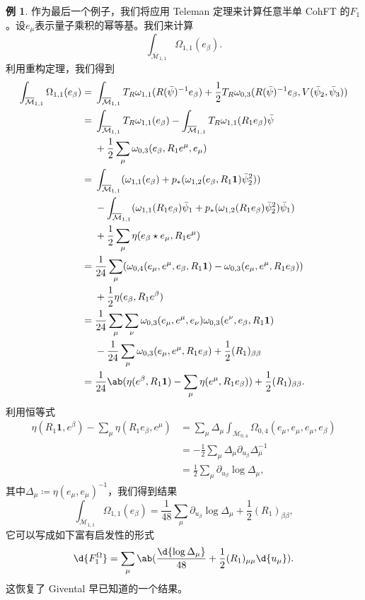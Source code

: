 \documentclass{amsart}
\theoremstyle{definition}
\newtheorem{exm}[thm]{例}
\theoremstyle{remark}
\theoremstyle{plain}
\theoremstyle{definition}
\theoremstyle{remark}
\newcommand{\Mbar}{\overline{\mathcal{M}}}
\newcommand{\1}{\mathbf{1}}
\newcommand{\2}{\mathbf{2}}
\newcommand{\3}{\mathbf{3}}
\begin{document}
\begin{exm}
    作为最后一个例子，我们将应用 Teleman 定理来计算任意半单 CohFT 的$F_1$。设$e_{\mu}$表示量子乘积的幂等基。我们来计算
    \[ \int_{\Mbar_{1,1}} \Omega_{1,1}(e_{\beta}). \]
    利用重构定理，我们得到
    \begin{align*}
        \int_{\Mbar_{1,1}}\Omega_{1,1}(e_{\beta}) ={}& \int_{\Mbar_{1,1}} T_R \omega_{1,1}(R(\bar{\psi})^{-1} e_{\beta}) + \frac{1}{2} T_R \omega_{0,3}(R(\bar{\psi})^{-1} e_{\beta}, V(\bar{\psi}_2, \bar{\psi}_3)) \\
        ={}& \int_{\Mbar_{1,1}}T_R\omega_{1,1}(e_{\beta}) - \int_{\Mbar_{1,1}} T_R \omega_{1,1}(R_1 e_{\beta})\bar{\psi} \\
        &+ \frac{1}{2}\sum_{\mu}  \omega_{0,3}(e_{\beta}, R_1 e^{\mu}, e_{\mu}) \\
        ={}& \int_{\Mbar_{1,1}} ( \omega_{1,1}(e_{\beta}) + p_* ( \omega_{1,2}(e_{\beta}, R_1 \1) \bar{\psi}_2^2 )) \\
        &- \int_{\Mbar_{1,1}} (\omega_{1,1}(R_1 e_{\beta})\bar{\psi}_1 + p_* ( \omega_{1,2}(R_1 e_{\beta}) \bar{\psi}_2^2 ) \bar{\psi}_1) \\
        &+ \frac{1}{2} \sum_{\mu} \eta(e_{\beta} \star e_{\mu}, R_1 e^{\mu}) \\
        ={}& \frac{1}{24} \sum_{\mu} ( \omega_{0,4}(e_{\mu}, e^{\mu}, e_{\beta}, R_1 \1) -\omega_{0,3}(e_{\mu}, e^{\mu}, R_1 e_{\beta}) )\\
        &+ \frac{1}{2} \eta(e_{\beta}, R_1 e^{\beta}) \\
        ={}& \frac{1}{24} \sum_{\mu}\sum_{\nu} \omega_{0,3}(e_{\mu}, e^{\mu}, e_{\nu})\omega_{0,3}(e^{\nu}, e_{\beta}, R_1 \1) \\
        &-\frac{1}{24} \sum_{\mu} \omega_{0,3}(e_{\mu}, e^{\mu}, R_1 e_{\beta}) + \frac{1}{2} (R_1)_{\beta\beta} \\
        ={}& \frac{1}{24} \ab(\eta(e^{\beta}, R_1 \1) - \sum_{\mu} \eta(e^{\mu}, R_1 e_{\beta})) + \frac{1}{2} (R_1)_{\beta\beta}.
    \end{align*}
    利用恒等式
    \begin{align*}
        \eta(R_1 \1, e^{\beta}) - \sum_{\mu} \eta(R_1 e_{\beta}, e^{\mu}) &= \sum_{\mu} \Delta_{\mu} \int_{\Mbar_{0,4}} \Omega_{0,4}(e_{\mu}, e_{\mu}, e_{\mu}, e_{\beta}) \\
        &= -\frac{1}{2}\sum_{\mu} \Delta_{\mu} \partial_{u_{\beta}} \Delta_{\mu}^{-1} \\
        &= \frac{1}{2} \sum_{\mu} \partial_{u_{\beta}} \log \Delta_{\mu},
    \end{align*}
    其中$\Delta_{\mu} \coloneqq \eta(e_{\mu}, e_{\mu})^{-1}$，我们得到结果
    \[ \int_{\Mbar_{1,1}} \Omega_{1,1}(e_{\beta}) = \frac{1}{48} \sum_{\mu} \partial_{u_{\beta}} \log \Delta_{\mu} + \frac{1}{2} (R_1)_{\beta\beta}, \]
    它可以写成如下富有启发性的形式
    \[ \d{F_1^{\Omega}} = \sum_{\mu} \ab( \frac{\d{\log \Delta_{\mu}}}{48} + \frac{1}{2} (R_1)_{\mu\mu} \d{u_{\mu}} ). \]
    这恢复了 Givental 早已知道的一个结果。
\end{exm}
\end{document}
